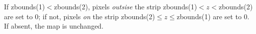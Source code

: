 If zbounds(1)$<$zbounds(2), pixels 
{\em outsise} the strip zbounds(1)$<z<$zbounds(2) are set to 0; if not,
pixels {\em on} the strip
zbounds(2)$\le z \le$zbounds(1) %
are set to 0.
If absent, the map is unchanged.
